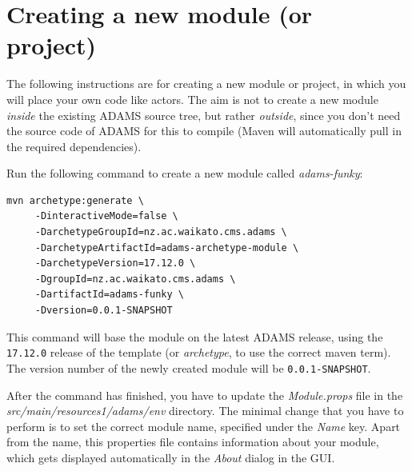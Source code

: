 \section{Creating a new module (or project)}
The following instructions are for creating a new module or project, in
which you will place your own code like actors. The aim is not to create
a new module \textit{inside} the existing ADAMS source tree, but rather \textit{outside},
since you don't need the source code of ADAMS for this to compile (Maven will
automatically pull in the required dependencies).

Run the following command to create a new module called \textit{adams-funky}:
\begin{verbatim}
mvn archetype:generate \
     -DinteractiveMode=false \
     -DarchetypeGroupId=nz.ac.waikato.cms.adams \
     -DarchetypeArtifactId=adams-archetype-module \
     -DarchetypeVersion=17.12.0 \
     -DgroupId=nz.ac.waikato.cms.adams \
     -DartifactId=adams-funky \
     -Dversion=0.0.1-SNAPSHOT
\end{verbatim}
This command will base the module on the latest ADAMS release,
using the \texttt{17.12.0} release of the template (or \textit{archetype}, to use
the correct maven term). The version number of the newly created module will be
\texttt{0.0.1-SNAPSHOT}.

After the command has finished, you have to update the \textit{Module.props}
file in the \textit{src/main/resources1/adams/env} directory. The minimal change
that you have to perform is to set the correct module name, specified under the
\textit{Name} key. Apart from the name, this properties file contains
information about your module, which gets displayed automatically in the
\textit{About} dialog in the GUI.

